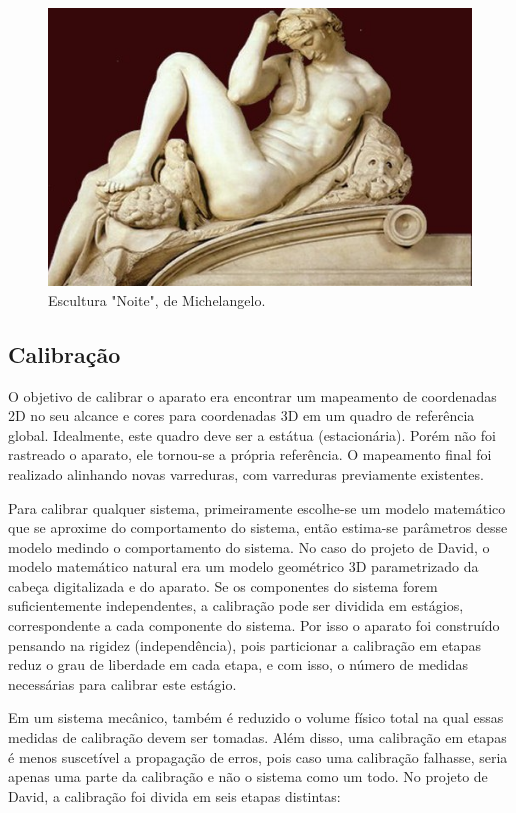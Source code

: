 \begin{figure}[!h]
	\centering
	\includegraphics[width=0.7\linewidth]{figs/michelangelo-notte.jpg}
	\caption{%
	Escultura "Noite", de Michelangelo.
	}\label{fig:noite}
\end{figure}

\subsection*{Calibração}

O objetivo de calibrar o aparato era encontrar um mapeamento de coordenadas 2D no seu alcance e cores para coordenadas 3D em um quadro de referência global. Idealmente, este quadro deve ser a estátua (estacionária). Porém não foi rastreado o aparato, ele tornou-se a própria referência. O mapeamento final foi realizado alinhando novas varreduras, com varreduras previamente existentes.

Para calibrar qualquer sistema, primeiramente escolhe-se um modelo matemático que se aproxime do comportamento do sistema, então estima-se parâmetros desse modelo medindo o comportamento do sistema. No caso do projeto de David, o modelo matemático natural era um modelo geométrico 3D parametrizado da cabeça digitalizada e do aparato. Se os componentes do sistema forem suficientemente independentes, a calibração pode ser dividida em estágios, correspondente a cada componente do sistema. Por isso o aparato foi construído pensando na rigidez (independência), pois particionar a calibração em etapas reduz o grau de liberdade em cada etapa, e com isso, o número de medidas necessárias para calibrar este estágio.

Em um sistema mecânico, também é reduzido o volume físico total na qual essas medidas de calibração devem ser tomadas. Além disso, uma calibração em etapas é menos suscetível a propagação de erros, pois caso uma calibração falhasse, seria apenas uma parte da calibração e não o sistema como um todo. No projeto de David, a calibração foi divida em seis etapas distintas:

